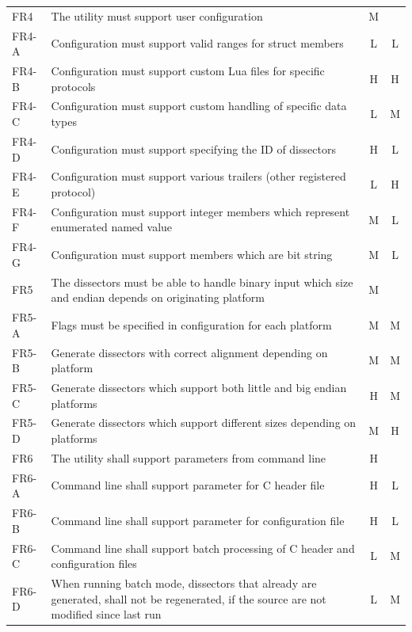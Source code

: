 \begin{table}[htbp]
{\begin{tabularx}{1.2\textwidth}{l X c c}
	\midrule
	FR4 & The utility must support user configuration & M & \\
	FR4-A & Configuration must support valid ranges for struct members & L & L \\
	FR4-B & Configuration must support custom Lua files for specific protocols & H & H \\
	FR4-C & Configuration must support custom handling of specific data types & L & M \\
	FR4-D & Configuration must support specifying the ID of dissectors & H & L \\
	FR4-E & Configuration must support various trailers (other registered protocol) & L & H \\
	FR4-F & Configuration must support integer members which represent enumerated named value & M & L \\	
	FR4-G & Configuration must support members which are bit string & M & L \\
	\midrule
	FR5 & The dissectors must be able to handle binary input which size and endian depends on originating platform & M & \\
	FR5-A & Flags must be specified in configuration for each platform & M & M \\
	FR5-B & Generate dissectors with correct alignment depending on platform & M & M \\
	FR5-C & Generate dissectors which support both little and big endian platforms & H & M \\
	FR5-D & Generate dissectors which support different sizes depending on platforms & M & H \\
	\midrule
	FR6 & The utility shall support parameters from command line & H & \\
	FR6-A & Command line shall support parameter for C header file & H & L \\
	FR6-B & Command line shall support parameter for configuration file & H & L \\
	FR6-C & Command line shall support batch processing of C header and configuration files & L & M \\
	FR6-D & When running batch mode, dissectors that already are generated, shall not be regenerated, if the source are not modified since last run & L & M \\
	\bottomrule
\end{tabularx}}
\end{table}


